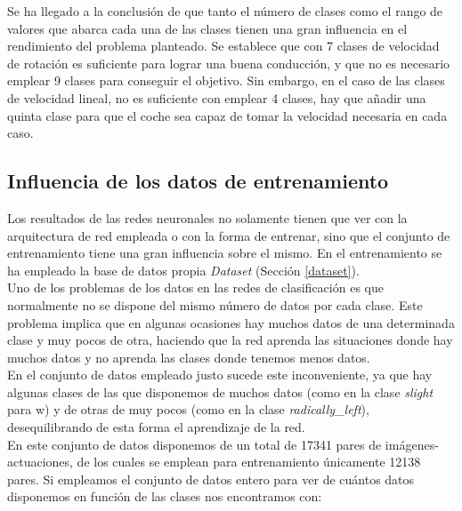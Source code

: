 Se ha llegado a la conclusión de que tanto el número de clases como el rango de valores que abarca cada una de las clases tienen una gran influencia en el rendimiento del problema planteado. Se establece que con 7 clases de velocidad de rotación es suficiente para lograr una buena conducción, y que no es necesario emplear 9 clases para conseguir el objetivo. Sin embargo, en el caso de las clases de velocidad lineal, no es suficiente con emplear 4 clases, hay que añadir una quinta clase para que el coche sea capaz de tomar la velocidad necesaria en cada caso.\\



\subsection{Influencia de los datos de entrenamiento}\label{influencia_datos}

Los resultados de las redes neuronales no solamente tienen que ver con la arquitectura de red empleada o con la forma de entrenar, sino que el conjunto de entrenamiento tiene una gran influencia sobre el mismo. En el entrenamiento se ha empleado la base de datos propia \textit{Dataset} (Sección \ref{dataset}). \\

Uno de los problemas de los datos en las redes de clasificación es que normalmente no se dispone del mismo número de datos por cada clase. Este problema implica que en algunas ocasiones hay muchos datos de una determinada clase y muy pocos de otra, haciendo que la red aprenda las situaciones donde hay muchos datos y no aprenda las clases donde tenemos menos datos.\\

En el conjunto de datos empleado justo sucede este inconveniente, ya que hay algunas clases de las que disponemos de muchos datos (como en la clase \textit{slight} para w) y de otras de muy pocos (como en la clase \textit{radically\_left}), desequilibrando de esta forma el aprendizaje de la red.\\

En este conjunto de datos disponemos de un total de 17341 pares de imágenes-actuaciones, de los cuales se emplean para entrenamiento únicamente 12138 pares. Si empleamos el conjunto de datos entero para ver de cuántos datos disponemos en función de las clases nos encontramos con:\\

